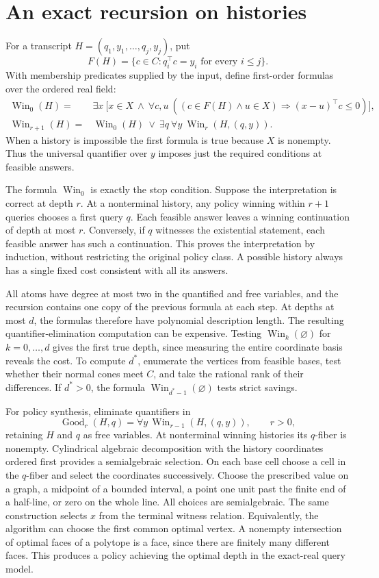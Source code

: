 \documentclass[11pt,a4paper]{amsart}
\newcommand{\Win}{\operatorname{Win}}
\newcommand{\Good}{\operatorname{Good}}
\begin{document}
\section{An exact recursion on histories}
For a transcript $H=(q_1,y_1,\ldots,q_j,y_j)$, put
\[
 F(H)=\{c\in C:q_i^\top c=y_i\text{ for every }i\leq j\}.
\]
With membership predicates supplied by the input, define first-order formulas over the ordered real field:
\begin{align*}
 \Win_0(H)={}&\exists x\ \bigl[x\in X\ \land\
 \forall c,u\ ((c\in F(H)\land u\in X)\Rightarrow (x-u)^\top c\leq0)\bigr],\\
 \Win_{r+1}(H)={}&\Win_0(H)\ \lor\
 \exists q\ \forall y\ \Win_r(H,(q,y)).
\end{align*}
When a history is impossible the first formula is true because $X$ is nonempty. Thus the universal quantifier over $y$ imposes just the required conditions at feasible answers.

The formula $\Win_0$ is exactly the stop condition. Suppose the interpretation is correct at depth $r$. At a nonterminal history, any policy winning within $r+1$ queries chooses a first query $q$. Each feasible answer leaves a winning continuation of depth at most $r$. Conversely, if $q$ witnesses the existential statement, each feasible answer has such a continuation. This proves the interpretation by induction, without restricting the original policy class. A possible history always has a single fixed cost consistent with all its answers.

All atoms have degree at most two in the quantified and free variables, and the recursion contains one copy of the previous formula at each step. At depths at most $d$, the formulas therefore have polynomial description length. The resulting quantifier-elimination computation can be expensive. Testing $\Win_k(\varnothing)$ for $k=0,\ldots,d$ gives the first true depth, since measuring the entire coordinate basis reveals the cost. To compute $d^*$, enumerate the vertices from feasible bases, test whether their normal cones meet $C$, and take the rational rank of their differences. If $d^*>0$, the formula $\Win_{d^*-1}(\varnothing)$ tests strict savings.

For policy synthesis, eliminate quantifiers in
\[
 \Good_r(H,q)=\forall y\,\Win_{r-1}(H,(q,y)),\qquad r>0,
\]
retaining $H$ and $q$ as free variables. At nonterminal winning histories its $q$-fiber is nonempty. Cylindrical algebraic decomposition \cite{collins} with the history coordinates ordered first provides a semialgebraic selection. On each base cell choose a cell in the $q$-fiber and select the coordinates successively. Choose the prescribed value on a graph, a midpoint of a bounded interval, a point one unit past the finite end of a half-line, or zero on the whole line. All choices are semialgebraic. The same construction selects $x$ from the terminal witness relation. Equivalently, the algorithm can choose the first common optimal vertex. A nonempty intersection of optimal faces of a polytope is a face, since there are finitely many different faces. This produces a policy achieving the optimal depth in the exact-real query model.
\end{document}

